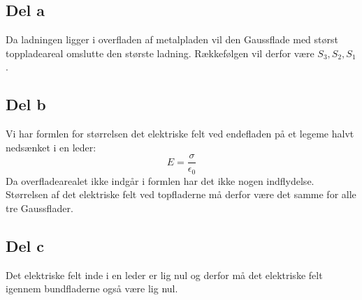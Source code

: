 \subsection{Del a} %
\label{sub:del_a}
Da ladningen ligger i overfladen af metalpladen vil den Gaussflade med størst toppladeareal omslutte den største ladning. Rækkefølgen vil derfor være $S_3, S_2, S_1$.

\subsection{Del b} %
\label{sub:del_b}
Vi har formlen for størrelsen det elektriske felt ved endefladen på et legeme halvt nedsænket i en leder:
\begin{equation}
	E = \frac{\sigma}{\epsilon _0}
\end{equation}
Da overfladearealet ikke indgår i formlen har det ikke nogen indflydelse. Størrelsen af det elektriske felt ved topfladerne må derfor være det samme for alle tre Gaussflader.

\subsection{Del c} %
\label{sub:del_c}
Det elektriske felt inde i en leder er lig nul og derfor må det elektriske felt igennem bundfladerne også være lig nul.
